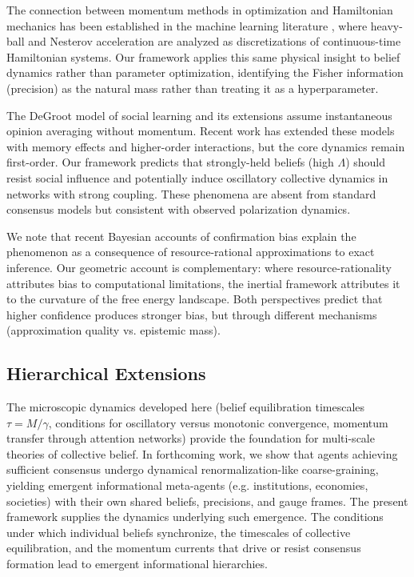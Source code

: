 \documentclass[12pt]{article}
\begin{document}
The connection between momentum methods in optimization and Hamiltonian mechanics has been established in the machine learning literature \citep{diakonikolas2021momentum}, where heavy-ball and Nesterov acceleration are analyzed as discretizations of continuous-time Hamiltonian systems. Our framework applies this same physical insight to belief dynamics rather than parameter optimization, identifying the Fisher information (precision) as the natural mass rather than treating it as a hyperparameter.

The DeGroot model of social learning \citep{degroot1974} and its extensions assume instantaneous opinion averaging without momentum. Recent work has extended these models with memory effects and higher-order interactions, but the core dynamics remain first-order. Our framework predicts that strongly-held beliefs (high $\Lambda$) should resist social influence and potentially induce oscillatory collective dynamics in networks with strong coupling. These phenomena are absent from standard consensus models but consistent with observed polarization dynamics.

We note that recent Bayesian accounts of confirmation bias \citep{daSilva2023confirmation} explain the phenomenon as a consequence of resource-rational approximations to exact inference. Our geometric account is complementary: where resource-rationality attributes bias to computational limitations, the inertial framework attributes it to the curvature of the free energy landscape. Both perspectives predict that higher confidence produces stronger bias, but through different mechanisms (approximation quality vs. epistemic mass).

\subsection{Hierarchical Extensions}

The microscopic dynamics developed here (belief equilibration timescales $\tau = M/\gamma$, conditions for oscillatory versus monotonic convergence, momentum transfer through attention networks) provide the foundation for multi-scale theories of collective belief. In forthcoming work, we show that agents achieving sufficient consensus undergo dynamical renormalization-like coarse-graining, yielding emergent informational meta-agents (e.g. institutions, economies, societies) with their own shared beliefs, precisions, and gauge frames. The present framework supplies the dynamics underlying such emergence.  The conditions under which individual beliefs synchronize, the timescales of collective equilibration, and the momentum currents that drive or resist consensus formation lead to emergent informational hierarchies.
\end{document}
